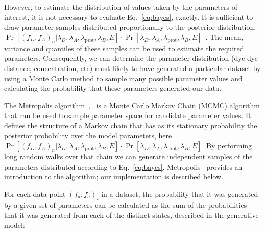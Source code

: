 However, to estimate the distribution of values taken by the parameters of interest, it is not necessary to evaluate Eq.~\ref{eq:bayes}, exactly. It is sufficient to draw parameter samples distributed proportionally to the posterior distribution, $\Pr[(f_D, f_A)_n |\lambda_D, \lambda_A, \lambda_{\text{prot}}, \lambda_B, E] \cdot \Pr[\lambda_D, \lambda_A, \lambda_{\text{prot}}, \lambda_B, E]$~\cite{hastings70}. The mean, variance and quantiles of these samples can be used to estimate the required parameters. Consequently, we can determine the parameter distribution (dye-dye distance, concentration, etc) most likely to have generated a particular dataset by using a Monte Carlo method to sample many possible parameter values and calculating the probability that these parameters generated our data.

The Metropolis algorithm~\cite{metropolis53},~\cite{hastings70} is a Monte Carlo Markov Chain (MCMC) algorithm that can be used to sample parameter space for candidate parameter values. It defines the structure of a Markov chain that has as its stationary probability the posterior probability over the model parameters, here $\Pr[(f_D, f_A)_n |\lambda_D, \lambda_A, \lambda_{\text{prot}}, \lambda_B, E] \cdot \Pr[\lambda_D, \lambda_A, \lambda_{\text{prot}}, \lambda_B, E]$. By performing long random walks over that chain we can generate independent samples of the parameters distributed according to Eq.~\ref{eq:bayes}. Metropolis~\cite{chib95} provides an introduction to the algorithm; our implementation is described below.


For each data point $(f_d, f_a)_i$ in a dataset, the probability that it was generated by a given set of parameters can be calculated as the sum of the probabilities that it was generated from each of the distinct states, described in the generative model:

